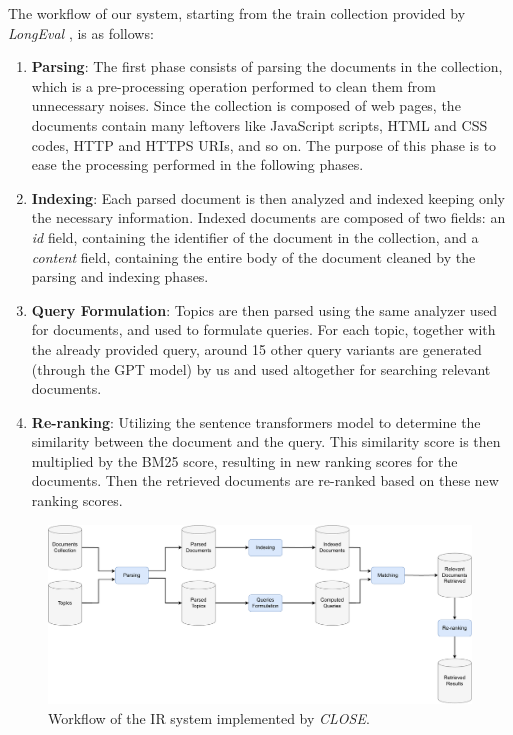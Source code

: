 The workflow of our system, starting from the train collection provided by \textit{LongEval} \cite{cleflongeval}, is as follows:
\begin{enumerate}
    \item \textbf{Parsing}: The first phase consists of parsing the documents in the collection, which is a pre-processing operation performed to clean them from unnecessary noises. Since the collection is composed of web pages, the documents contain many leftovers like JavaScript scripts, HTML and CSS codes, HTTP and HTTPS URIs, and so on. The purpose of this phase is to ease the processing performed in the following phases.

    \item \textbf{Indexing}: Each parsed document is then analyzed and indexed keeping only the necessary information. Indexed documents are composed of two fields: an \textit{id} field, containing the identifier of the document in the collection, and a \textit{content} field, containing the entire body of the document cleaned by the parsing and indexing phases.

    \item \textbf{Query Formulation}: Topics are then parsed using the same analyzer used for documents, and used to formulate queries. For each topic, together with the already provided query, around 15 other query variants are generated (through the GPT model) by us and used altogether for searching relevant documents.

    \item \textbf{Re-ranking}: Utilizing the sentence transformers model to determine the similarity between the document and the query. This similarity score is then multiplied by the BM25 score, resulting in new ranking scores for the documents. Then the retrieved documents are re-ranked based on these new ranking scores.

\end{enumerate}

\begin{figure}[!h]
    \centering
    \includegraphics[width=\textwidth, height=\textheight, keepaspectratio]{figure/CLOSE_IR_Workflow (2).pdf}
    \caption{Workflow of the IR system implemented by \textit{CLOSE}.}
    \label{fig:CLOSE_IR_Workflow}
\end{figure}

